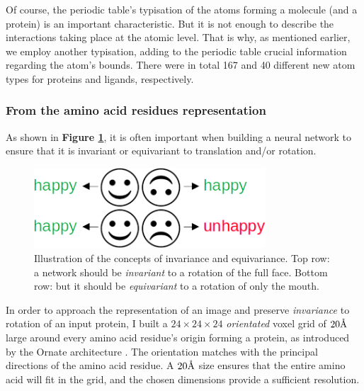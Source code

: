 \documentclass{article}
\newcommand{\angstrom}{\textup{\AA}}
\begin{document}
Of course, the periodic table's typisation of the atoms forming a molecule (and a protein) is an important characteristic. But it is not enough to describe the interactions taking place at the atomic level. That is why, as mentioned earlier, we employ another typisation, adding to the periodic table crucial information regarding the atom's bounds. There were in total 167 and 40 different new atom types for proteins and ligands, respectively.

\subsubsection{From the amino acid residues representation}

As shown in \textbf{Figure \ref{fig:in_equi_variance}}, it is often important when building a neural network to ensure that it is invariant or equivariant to translation and/or rotation. \\
\begin{figure}[H]
    \centering
    \includegraphics[height=3cm,width=\textwidth,keepaspectratio]{in_equi_variance.png}
    \caption{Illustration of the concepts of invariance and equivariance. Top row: a network should be \textit{invariant} to a rotation of the full face. Bottom row: but it should be \textit{equivariant} to a rotation of only the mouth.}
    \label{fig:in_equi_variance}
\end{figure}
In order to approach the representation of an image and preserve \textit{invariance} to rotation of an input protein, I built a $24 \times 24 \times 24$ \textit{orientated} voxel grid of $20 \angstrom$ large around every amino acid residue's origin forming a protein, as introduced by the Ornate architecture \cite{Ornate}. The orientation matches with the principal directions of the amino acid residue. A $20 \angstrom$ size ensures that the entire amino acid will fit in the grid, and the chosen dimensions provide a sufficient resolution.
\end{document}
